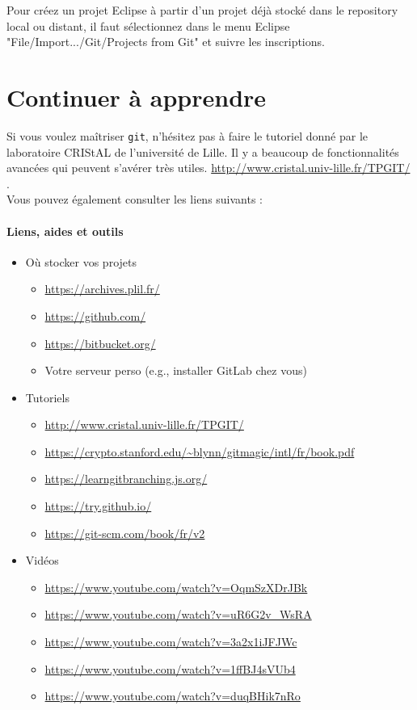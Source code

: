 \documentclass[final, a4paper, openbib, ]{article}
\begin{document}
Pour créez un projet Eclipse à partir d'un projet déjà stocké dans le repository local ou distant, il faut sélectionnez dans le menu Eclipse "File/Import.../Git/Projects from Git" et suivre les inscriptions.

%

\section{Continuer à apprendre}

Si vous voulez maîtriser \texttt{git}, n'hésitez pas à faire le tutoriel donné par le laboratoire CRIStAL de l'université de Lille.
Il y a beaucoup de fonctionnalités avancées qui peuvent s'avérer très utiles.
\url{http://www.cristal.univ-lille.fr/TPGIT/} .\\

Vous pouvez également consulter les liens suivants :
\paragraph{Liens, aides et outils}
\begin{itemize}
	\item Où stocker vos projets
	\begin{itemize}
		\item \url{https://archives.plil.fr/}
		\item \url{https://github.com/}
		\item \url{https://bitbucket.org/}
		\item Votre serveur perso (e.g., installer GitLab chez vous)
	\end{itemize}
	\item Tutoriels
	\begin{itemize}
		\item \url{http://www.cristal.univ-lille.fr/TPGIT/}
		\item \url{https://crypto.stanford.edu/~blynn/gitmagic/intl/fr/book.pdf}
		\item \url{https://learngitbranching.js.org/}
		\item \url{https://try.github.io/}
		\item \url{https://git-scm.com/book/fr/v2}
	\end{itemize}
	\item Vidéos
	\begin{itemize}
		\item \url{https://www.youtube.com/watch?v=OqmSzXDrJBk}
		\item \url{https://www.youtube.com/watch?v=uR6G2v_WsRA}
		\item \url{https://www.youtube.com/watch?v=3a2x1iJFJWc}
		\item \url{https://www.youtube.com/watch?v=1ffBJ4sVUb4}
		\item \url{https://www.youtube.com/watch?v=duqBHik7nRo}
	\end{itemize}
\end{itemize}
\end{document}
